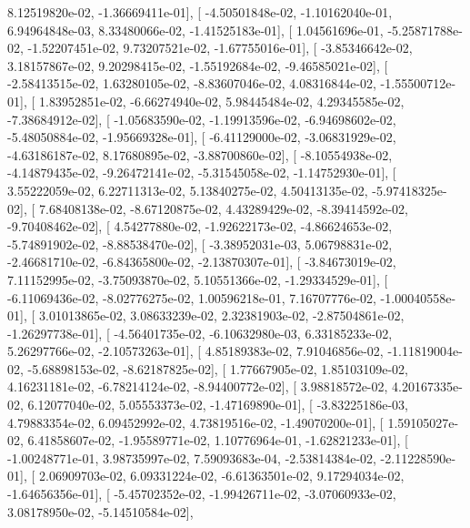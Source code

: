 \documentclass{article}
\begin{document}
          8.12519820e-02,  -1.36669411e-01],
       [ -4.50501848e-02,  -1.10162040e-01,   6.94964848e-03,
          8.33480066e-02,  -1.41525183e-01],
       [  1.04561696e-01,  -5.25871788e-02,  -1.52207451e-02,
          9.73207521e-02,  -1.67755016e-01],
       [ -3.85346642e-02,   3.18157867e-02,   9.20298415e-02,
         -1.55192684e-02,  -9.46585021e-02],
       [ -2.58413515e-02,   1.63280105e-02,  -8.83607046e-02,
          4.08316844e-02,  -1.55500712e-01],
       [  1.83952851e-02,  -6.66274940e-02,   5.98445484e-02,
          4.29345585e-02,  -7.38684912e-02],
       [ -1.05683590e-02,  -1.19913596e-02,  -6.94698602e-02,
         -5.48050884e-02,  -1.95669328e-01],
       [ -6.41129000e-02,  -3.06831929e-02,  -4.63186187e-02,
          8.17680895e-02,  -3.88700860e-02],
       [ -8.10554938e-02,  -4.14879435e-02,  -9.26472141e-02,
         -5.31545058e-02,  -1.14752930e-01],
       [  3.55222059e-02,   6.22711313e-02,   5.13840275e-02,
          4.50413135e-02,  -5.97418325e-02],
       [  7.68408138e-02,  -8.67120875e-02,   4.43289429e-02,
         -8.39414592e-02,  -9.70408462e-02],
       [  4.54277880e-02,  -1.92622173e-02,  -4.86624653e-02,
         -5.74891902e-02,  -8.88538470e-02],
       [ -3.38952031e-03,   5.06798831e-02,  -2.46681710e-02,
         -6.84365800e-02,  -2.13870307e-01],
       [ -3.84673019e-02,   7.11152995e-02,  -3.75093870e-02,
          5.10551366e-02,  -1.29334529e-01],
       [ -6.11069436e-02,  -8.02776275e-02,   1.00596218e-01,
          7.16707776e-02,  -1.00040558e-01],
       [  3.01013865e-02,   3.08633239e-02,   2.32381903e-02,
         -2.87504861e-02,  -1.26297738e-01],
       [ -4.56401735e-02,  -6.10632980e-03,   6.33185233e-02,
          5.26297766e-02,  -2.10573263e-01],
       [  4.85189383e-02,   7.91046856e-02,  -1.11819004e-02,
         -5.68898153e-02,  -8.62187825e-02],
       [  1.77667905e-02,   1.85103109e-02,   4.16231181e-02,
         -6.78214124e-02,  -8.94400772e-02],
       [  3.98818572e-02,   4.20167335e-02,   6.12077040e-02,
          5.05553373e-02,  -1.47169890e-01],
       [ -3.83225186e-03,   4.79883354e-02,   6.09452992e-02,
          4.73819516e-02,  -1.49070200e-01],
       [  1.59105027e-02,   6.41858607e-02,  -1.95589771e-02,
          1.10776964e-01,  -1.62821233e-01],
       [ -1.00248771e-01,   3.98735997e-02,   7.59093683e-04,
         -2.53814384e-02,  -2.11228590e-01],
       [  2.06909703e-02,   6.09331224e-02,  -6.61363501e-02,
          9.17294034e-02,  -1.64656356e-01],
       [ -5.45702352e-02,  -1.99426711e-02,  -3.07060933e-02,
          3.08178950e-02,  -5.14510584e-02],
\end{document}
